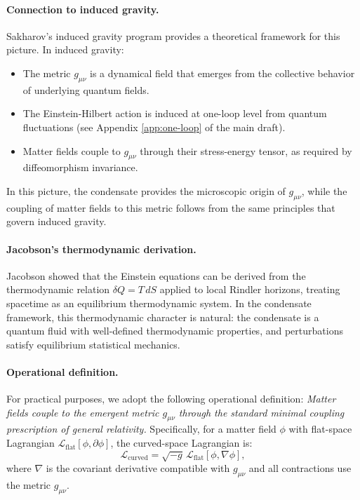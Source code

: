 \paragraph{Connection to induced gravity.}
Sakharov's induced gravity program \cite{Sakharov} provides a theoretical framework for this picture. In induced gravity:
\begin{itemize}[leftmargin=1.8em]
    \item The metric $g_{\mu\nu}$ is a dynamical field that emerges from the collective behavior of underlying quantum fields.
    \item The Einstein-Hilbert action is induced at one-loop level from quantum fluctuations (see Appendix \ref{app:one-loop} of the main draft).
    \item Matter fields couple to $g_{\mu\nu}$ through their stress-energy tensor, as required by diffeomorphism invariance.
\end{itemize}

In this picture, the condensate provides the microscopic origin of $g_{\mu\nu}$, while the coupling of matter fields to this metric follows from the same principles that govern induced gravity.

\paragraph{Jacobson's thermodynamic derivation.}
Jacobson \cite{Jacobson1995} showed that the Einstein equations can be derived from the thermodynamic relation $\delta Q = T \, dS$ applied to local Rindler horizons, treating spacetime as an equilibrium thermodynamic system. In the condensate framework, this thermodynamic character is natural: the condensate is a quantum fluid with well-defined thermodynamic properties, and perturbations satisfy equilibrium statistical mechanics.

\paragraph{Operational definition.}
For practical purposes, we adopt the following operational definition: \emph{Matter fields couple to the emergent metric $g_{\mu\nu}$ through the standard minimal coupling prescription of general relativity.} Specifically, for a matter field $\phi$ with flat-space Lagrangian $\mathcal{L}_{\mathrm{flat}}[\phi, \partial\phi]$, the curved-space Lagrangian is:
\begin{equation}
\mathcal{L}_{\mathrm{curved}} = \sqrt{-g} \, \mathcal{L}_{\mathrm{flat}}[\phi, \nabla\phi],
\end{equation}
where $\nabla$ is the covariant derivative compatible with $g_{\mu\nu}$ and all contractions use the metric $g_{\mu\nu}$.

